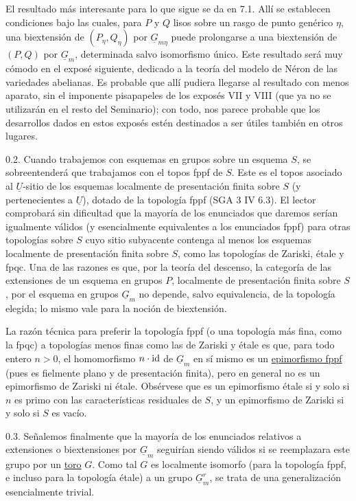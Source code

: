 
El resultado más interesante para lo que sigue se da en 7.1. Allí se
establecen condiciones bajo las cuales, para $P$ y $Q$ lisos sobre un
rasgo de punto genérico $\eta$, una biextensión de
$(P_\eta,Q_\eta)$ por $\underline G_{m\eta}$ puede prolongarse a una
biextensión de $(P,Q)$ por $\underline G_m$, determinada salvo
isomorfismo único. Este resultado será muy cómodo en el exposé
siguiente, dedicado a la teoría del modelo de Néron de las variedades
abelianas. Es probable que allí pudiera llegarse al resultado con
menos aparato, sin el imponente pisapapeles de los exposés VII y VIII
(que ya no se utilizarán en el resto del Seminario); con todo, nos
parece probable que los desarrollos dados en estos exposés estén
destinados a ser útiles también en otros lugares.

0.2. Cuando trabajemos con esquemas en grupos sobre un esquema $S$, se
sobreentenderá que trabajamos con el topos fppf de $S$. Este es el
topos asociado al $\underline U$-sitio de los esquemas localmente de
presentación finita sobre $S$ (y pertenecientes a $\underline U$),
dotado de la topología fppf (SGA 3 IV 6.3). El lector comprobará sin
dificultad que la mayoría de los enunciados que daremos serían
igualmente válidos (y esencialmente equivalentes a los enunciados
fppf) para otras topologías sobre $S$ cuyo sitio subyacente contenga
al menos los esquemas localmente de presentación finita sobre $S$,
como las topologías de Zariski, étale y fpqc. Una de las razones es que,
por la teoría del descenso, la categoría de las extensiones de un
esquema en grupos $P$, localmente de presentación finita sobre $S$,
por el esquema en grupos $\underline G_m$ no depende, salvo
equivalencia, de la topología elegida; lo mismo vale para la noción de
biextensión.

La razón técnica para preferir la topología fppf (o una topología más
fina, como la fpqc) a topologías menos finas como las de Zariski y
étale es que, para todo entero $n>0$, el homomorfismo $n\cdot\mathrm{id}$ de
$\underline G_m$ en sí mismo es un \underline{epimorfismo fppf}
(pues es fielmente plano y de presentación finita), pero en general no
es un epimorfismo de Zariski ni étale. Obsérvese que es un epimorfismo
étale si y solo si $n$ es primo con las características residuales de
$S$, y un epimorfismo de Zariski si y solo si $S$ es vacío.


0.3. Señalemos finalmente que la mayoría de los enunciados relativos a
extensiones o biextensiones por $\underline G_m$ seguirían siendo
válidos si se reemplazara este grupo por un \underline{toro} $G$.
Como tal $G$ es localmente isomorfo (para la topología fppf, e incluso
para la topología étale) a un grupo $\underline G_m^r$, se trata de una
generalización esencialmente trivial.
